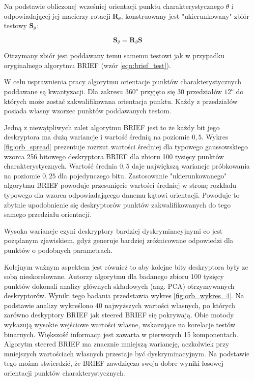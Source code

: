 Na podstawie obliczonej wcześniej orientacji punktu charakterystycznego $\theta$ i odpowiadającej jej macierzy rotacji $\textbf{R}_{\theta}$, konstruowany jest "ukierunkowany" zbiór testowy $\textbf{S}_{\theta}$:

\begin{equation}
\textbf{S}_\theta = \textbf{R}_\theta \textbf{S}
\end{equation}

Otrzymany zbiór jest poddawany temu samemu testowi jak w przypadku oryginalnego algorytmu BRIEF (wzór \ref{eqn:brief_test}).

W celu usprawnienia pracy algorytmu orientacje punktów charakterystycznych poddawane są kwantyzacji. Dla zakresu $360^o$ przyjęto się 30 przedziałów $12^o$ do których może zostać zakwalifikowana orientacja punktu. Każdy z przedziałów posiada własny wzorzec punktów poddawanych testom.

Jedną z niewątpliwych zalet algorytmu BRIEF jest to że każdy bit jego deskryptora ma dużą wariancje i wartość średnią na poziomie $0,5$. Wykres \ref{fig:orb_spread} prezentuje rozrzut wartości średniej dla typowego gaussowskiego wzorca 256 bitowego deskryptora BRIEF dla zbioru 100 tysięcy punktów charakterystycznych. Wartość średnia $0,5$ daje największą wariancje próbkowania na poziomie $0,25$ dla pojedynczego bitu. Zastosowanie "ukierunkowanego" algorytmu BRIEF powoduje przesunięcie wartości średniej w stronę rozkładu typowego dla wzorca odpowiadającego danemu kątowi orientacji. Powoduje to zbytnie upodobnienie się deskryptorów punktów zakwalifikowanych do tego samego przedziału orientacji.

Wysoka wariancje czyni deskryptory bardziej dyskryminacyjnymi co jest pożądanym zjawiskiem, gdyż generuje bardziej zróżnicowane odpowiedzi dla punktów o podobnych parametrach. 

Kolejnym ważnym aspektem  jest również to aby kolejne bity deskryptora były ze sobą nieskorelowane. Autorzy algorytmu dla badanego zbioru 100 tysięcy punktów dokonali analizy głównych składowych (ang. PCA) otrzymywanych deskryptorów. Wyniki tego badania przedstawia wykres \ref{fig:orb_wykres_4}. Na podstawie analizy wykreślono 40 najwyższych wartości własnych, po których zarówno deskyptory BRIEF jak steered BRIEF się pokrywają. Obie motody wykazują wysokie wejściowe wartości własne, wskazujące na korelacje testów binarnych. Większość informacji jest zawarta w pierwszych 15 komponentach. Algorytm steered BRIEF ma znacznie mniejszą wariancję, aczkolwiek przy mniejszych wartościach własnych przestaje być dyskryminacyjnym. Na podstawie tego można stwierdzić, że BRIEF zawdzięcza swoja dobre wyniki losowej orientacji punktów charakterystycznych.

